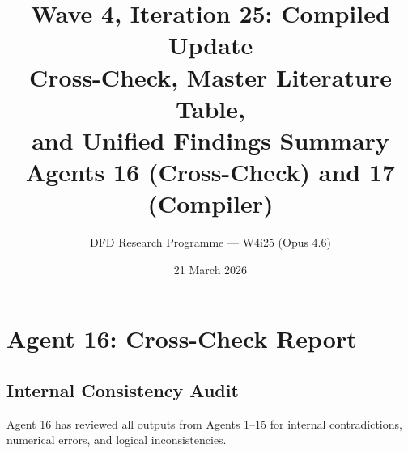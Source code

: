 \documentclass[11pt]{article}
\title{\textbf{Wave 4, Iteration 25: Compiled Update}\\[12pt]
{\large Cross-Check, Master Literature Table,\\
and Unified Findings Summary}\\[4pt]
{\large Agents 16 (Cross-Check) and 17 (Compiler)}}
\author{DFD Research Programme --- W4i25 (Opus 4.6)}
\date{21 March 2026}
\begin{document}
\maketitle
\tableofcontents
\newpage

\section{Agent 16: Cross-Check Report}

\subsection{Internal Consistency Audit}

Agent 16 has reviewed all outputs from Agents 1--15 for internal
contradictions, numerical errors, and logical inconsistencies.
\end{document}
